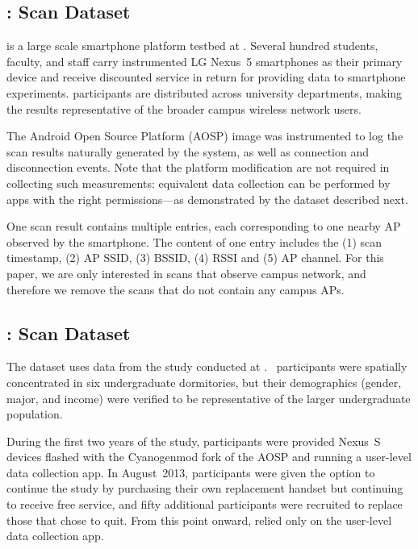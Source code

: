 \subsection{\ubscan{}: \PhoneLab{} \wifi{} Scan Dataset}
\label{sec:phonelab}

\PhoneLab{} is a large scale smartphone platform testbed at \ub{}. Several
hundred students, faculty, and staff carry instrumented LG Nexus~5 smartphones
as their primary device and receive discounted service in return for providing
data to smartphone experiments. \PhoneLab{} participants are distributed across
university departments, making the results representative of the broader campus
wireless network users.

The \PhoneLab{} Android Open Source Platform (AOSP) image was instrumented to
log the \wifi{} scan results naturally generated by the system, as well as
\wifi{} connection and disconnection events. Note that the
platform modification are not required in collecting such measurements: equivalent
data collection can be performed by apps with the right permissions---as
demonstrated by the \ndscan{} dataset described next.

One scan result contains multiple entries, each corresponding to one nearby
\wifi{} AP observed by the smartphone. The content of one entry includes the
(1) scan timestamp, (2) AP SSID, (3) BSSID, (4) RSSI and (5) AP channel. For
this paper, we are only interested in \wifi{} scans that observe \ub{} campus
network, and therefore we remove the scans that do not contain any campus
APs.


\subsection{\ndscan{}: \NetSense{} \wifi{} Scan Dataset}
\label{sec:netsense}

The \ndscan{} dataset uses data from the \NetSense{} study
conducted at \nd{}.
\NetSense{}~participants were spatially concentrated in six undergraduate
dormitories, but their demographics (gender, major, and income) were verified
to be representative of the larger undergraduate population.

During the first two years of the study, \NetSense{} participants were
provided Nexus~S devices flashed with the Cyanogenmod fork of the AOSP and
running a user-level data collection app. In August~2013, participants were
given the option to continue the study by purchasing their own replacement
handset but continuing to receive free service, and fifty additional
participants were recruited to replace those that chose to quit. From this
point onward, \NetSense{} relied only on the user-level data collection app.

